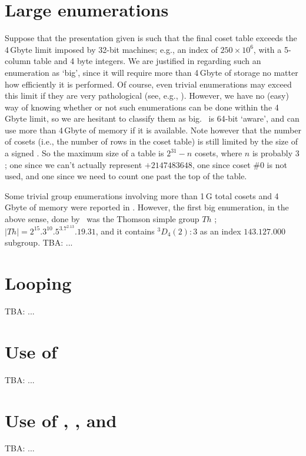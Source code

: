 \section{Large enumerations}

Suppose that the presentation given is such that the final coset table
  exceeds the 4\,Gbyte limit imposed by 32-bit machines; e.g., an index of
  $250 \times 10^6$\kern-2pt, with a 5-column table and 4 byte integers.
We are justified in regarding such an enumeration as `big'\kern-1.5pt, 
  since it will require more than 4\,Gbyte of storage no matter how
  efficiently it is performed.
Of course, even trivial enumerations may exceed this limit if they are
  very pathological (see, e.g., \cite{HR2}).
However, we have no (easy) way of knowing whether or not such enumerations
  can be done within the 4\,Gbyte limit, so we are hesitant to classify
  them as big.
\ace\ is 64-bit `aware'\kern-1.5pt, and can use more than 4\,Gbyte of
  memory if it is available.
Note however that the number of cosets (i.e., the number of rows in the
  coset table) is still limited by the size of a signed .
So the maximum size of a table is $2^{31} - n$ cosets, where $n$ is
  probably $3$; one since we can't actually represent $+2147483648$, one
  since coset \#0 is not used, and one since we need to count one past the
  top of the table.

Some trivial group enumerations involving more than 1\,G total cosets 
  and 4\,Gbyte of memory were reported in \cite{HR2}.
However, the first big enumeration, in the above sense, done by \ace\ was
  the Thomson simple group $\mathit{Th}$ \cite{MR1829480};
$|\mathit{Th}|=2^{15}.3^{10}.5^3.7^2.13.19.31$,
and it contains $^3D_4(2):3$ as an index $143.127.000$ subgroup.
TBA: ...

\section{Looping}

TBA: ...

\section{Use of }\label{ex007}

TBA: ...

\section{Use of , ,  and } 

TBA: ...

